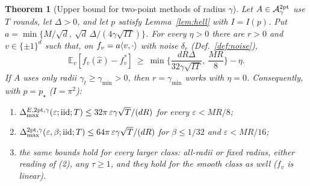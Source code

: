 \documentclass[11pt,a4paper]{article}
\numberwithin{equation}{section}
\newtheorem{theorem}{Theorem}[section]
\theoremstyle{definition}
\theoremstyle{remark}
\newcommand{\E}{\mathbb E}\newcommand{\R}{\mathbb R}\newcommand{\Z}{\mathbb Z}\newcommand{\Prob}{\mathbb P}
\newcommand{\Dmax}{\Delta_{\max}}\newcommand{\Dcp}{\Delta_{\rm cp}}\newcommand{\Dlow}{\Delta_{\rm low}}
\begin{document}
\begin{theorem}[Upper bound for two-point methods of radius $\gamma$]\label{thm:upper}
Let $A\in\mathcal A^{\rm 2pt}_\gamma$ use $T$ rounds, let $\Delta>0$, and let $p$ satisfy Lemma~\ref{lem:hell} with $I=I(p)$. Put $a=\min\{M/\sqrt d,\ \sqrt d\,\Delta/(4\gamma\sqrt{IT})\}$. For every $\eta>0$ there are $r>0$ and $v\in\{\pm1\}^d$ such that, on $f_v=a\langle v,\cdot\rangle$ with noise $\delta_r$ (Def.~\ref{def:noise}),
\[
\E_v[f_v(\hat x)-f_v^*]\ \ge\ \min\Big\{\frac{dR\Delta}{32\gamma\sqrt{IT}},\ \frac{MR}8\Big\}-\eta .
\]
If $A$ uses only radii $\gamma_t\ge\gamma_{\min}>0$, then $r=\gamma_{\min}$ works with $\eta=0$. Consequently, with $p=p_\star$ ($I=\pi^2$):
\begin{enumerate}[label=(\alph*)]
\item $\Dmax^{E,\mathrm{2pt},\gamma}(\varepsilon;\iid;T)\le32\pi\,\varepsilon\gamma\sqrt T/(dR)$ for every $\varepsilon<MR/8$;
\item $\Dmax^{\mathrm{2pt},\gamma}(\varepsilon,\beta;\iid;T)\le64\pi\,\varepsilon\gamma\sqrt T/(dR)$ for $\beta\le1/32$ and $\varepsilon<MR/16$;
\item the same bounds hold for every larger class: all-radii or fixed radius, either reading of (2), any $\tau\ge1$, and they hold for the smooth class as well ($f_v$ is linear).
\end{enumerate}
\end{theorem}
\end{document}
